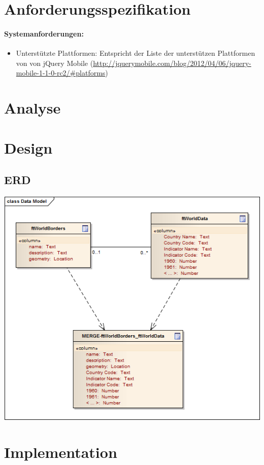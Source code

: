 \section{Anforderungsspezifikation}
\paragraph{Systemanforderungen:}
\begin{itemize}
\item Unterstützte Plattformen: Entspricht der Liste der unterstützen Plattformen von von jQuery Mobile (\url{http://jquerymobile.com/blog/2012/04/06/jquery-mobile-1-1-0-rc2/#platforms})
\end{itemize}

\section{Analyse}

\section{Design}
\subsection{ERD}
\includegraphics[scale=0.8]{images/usecase1-worlddata-erd.png}

\section{Implementation}
